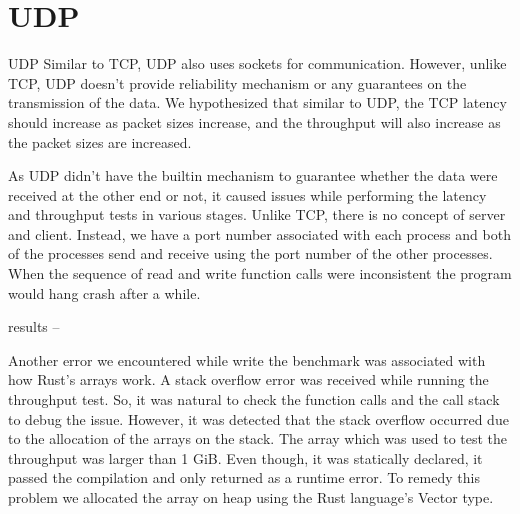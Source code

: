 \section{UDP}
UDP 
Similar to TCP, UDP also uses sockets for communication. However, unlike TCP, UDP doesn't provide reliability mechanism or any guarantees on the transmission of the data. We hypothesized that similar to UDP, the TCP latency should increase as packet sizes increase, and the throughput will also increase as the packet sizes are increased.

As UDP didn't have the builtin mechanism to guarantee whether the data were received at the other end or not, it caused issues while performing the latency and throughput tests in various stages. Unlike TCP, there is no concept of server and client. Instead, we have a port number associated with each process and both of the processes send and receive using the port number of the other processes. When the sequence of read and write function calls were inconsistent the program would hang crash after a while.  

results --

Another error we encountered while write the benchmark was associated with how Rust's arrays work. A stack overflow error was received while running the throughput test. So, it was natural to check the function calls and the call stack to debug the issue. However, it was detected that the stack overflow occurred due to the allocation of the arrays on the stack. The array which was used to test the throughput was larger than 1 GiB. Even though, it was statically declared, it passed the compilation and only returned as a runtime error. To remedy this problem we allocated the array on heap using the Rust language's Vector type.



